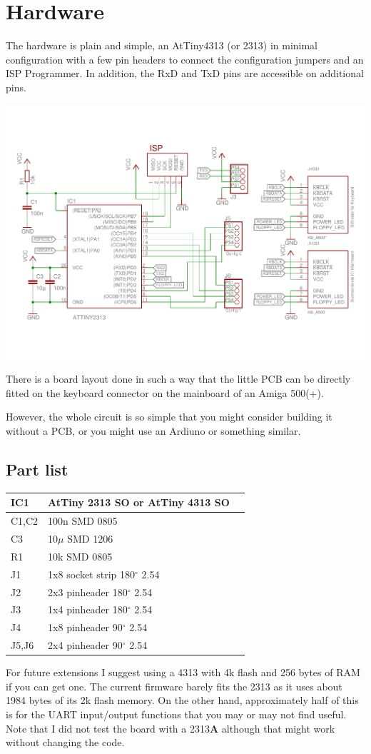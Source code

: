 \documentclass[DIV10]{scrartcl}
\begin{document}
\section{Hardware}
The hardware is plain and simple, an AtTiny4313 (or 2313) in
minimal configuration with a few pin headers to connect the
configuration jumpers and an ISP Programmer.
In addition, the RxD and TxD pins are accessible on additional
pins.
\begin{center}
  \includegraphics[width=.7\linewidth]{../hardware/schematic.pdf}
\end{center}
There is a board layout done in such a way that the little PCB can be
directly fitted on the keyboard connector on the mainboard of an Amiga
500(+).

However, the whole circuit is so simple that you might consider
building it without a PCB, or you might use an Ardiuno or something
similar. 

\subsection{Part list}
\begin{center}
  \begin{tabular}{|l|l|l|}
    \hline
    IC1 & AtTiny 2313 SO or AtTiny 4313 SO\\
    \hline
    C1,C2 & 100n SMD 0805 \\
    C3 & 10$\mu$ SMD 1206 \\
    R1 & 10k SMD 0805 \\
    \hline
    J1  & 1x8 socket strip 180$^\circ$ 2.54\\
    J2  & 2x3 pinheader 180$^\circ$ 2.54\\
    J3  & 1x4 pinheader 180$^\circ$ 2.54\\
    J4  & 1x8 pinheader 90$^\circ$ 2.54\\
    J5,J6  & 2x4 pinheader 90$^\circ$ 2.54\\
    \hline
  \end{tabular}
\end{center}
For future extensions I suggest using a 4313 with 4k flash and 256
bytes of RAM if you can get one. The current firmware barely fits the
2313 as it uses about 1984 bytes of its 2k flash memory. On the other
hand, approximately half of this is for the UART input/output
functions that you may or may not find useful. Note that I did not
test the board with a 2313{\bfseries A} although that might work
without changing the code.
\end{document}

